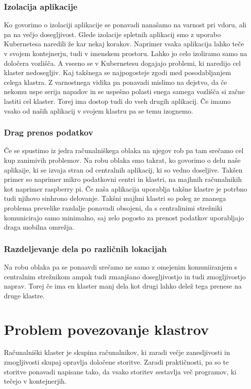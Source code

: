 \documentclass[a4paper, 12pt]{book}
\begin{document}
\subsection{Izolacija aplikacije}
Ko govorimo o izolaciji aplikacije se ponavadi nanašamo na varnost pri vdoru, ali pa na večjo dosegljivost.
Glede izolacije spletnih aplikacij smo z uporabo Kubernetesa naredili že kar nekaj korakov.
Naprimer vsaka aplikacija lahko teče v svojem kontejnerju, tudi v imenskem prostoru.
Lahko jo celo izoliramo samo na določera vozlišča.
A vseeno se v Kubernetesu dogajajo problemi, ki naredijo cel klaster nedosegljiv.
Kaj takšnega se najpogosteje zgodi med posodabljanjem celega klastra.
Z varnostnega vidika pa ponavadi mislimo na dejstvo, da če nekomu uspe serija napadov in se uspešno polasti enega samega vozlišča si začne lastiti cel klaster.
Torej ima dostop tudi do vseh drugih aplikacij.
Če imamo vsako od naših aplikacij v svojem klastru pa se temu izognemo.
\subsection{Drag prenos podatkov}
Če se spustimo iz jedra računalniškega oblaka na njegov rob pa tam srečamo cel kup zanimivih problemov. 
Na robu oblaka smo takrat, ko govorimo o delu naše aplikaije, ki se izvaja stran od centralnih aplikacij, ki so vedno doseljive.
Takšen primer so naprimer mikro podatkovni centri in klastri, na majhnih računalnikih kot naprimer raspberry pi.
Če naša aplikacija uporablja takšne klastre je potrbno tudi njihovo sinhrono delovanje.
Takšni majhni klastri so poleg ze znanega problema prevelike razdalje ponavadi obsojeni, da s centralinimi strežniki komunicirajo samo minimalno, saj zelo pogosto za prenost podatkov uporabljajo draga mobilna omrežja.
\subsection{Razdeljevanje dela po različnih lokacijah}
Na robu oblaka pa se ponaavdi srečamo ne samo z omejenim komuniiranjem s centralnim strežnikom ampak tudi zmanjšano dosegljivostjo in tudi zmogljivostjo naprav.
Torej če ima en klaster manj dela kot drugi lahko delež tega prenese na druge klastre.
\chapter{Problem povezovanje klastrov}
Računalniški klaster je skupina računalnikov, ki zaradi večje zanesljivosti in zmogljivosti skupaj opravlja določene storitve.
Zaradi praktičnosti, pa so te storitve ponavadi napisane tako, da vsako storitev sestavlja več programov, ki tečejo v kontejnerjih.
\end{document}
